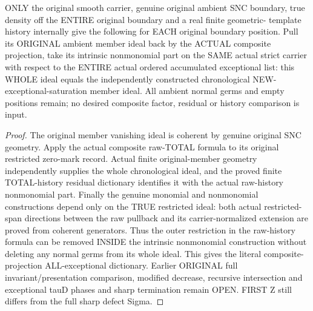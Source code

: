 \begin{theorem}
\label{hir:sharp-actual-original-composite-total-all-exceptional-residual}
\leanok
ONLY the original smooth carrier, genuine original ambient SNC boundary,
true density off the ENTIRE original boundary and a real finite geometric-
template history internally give the following for EACH original boundary
position. Pull its ORIGINAL ambient member ideal back by the ACTUAL
composite projection, take its intrinsic nonmonomial part on the SAME
actual strict carrier with respect to the ENTIRE actual ordered
accumulated exceptional list: this WHOLE ideal equals the independently
constructed chronological NEW-exceptional-saturation member ideal.
All ambient normal germs and empty positions remain; no desired composite
factor, residual or history comparison is input.
\end{theorem}
\begin{proof}
The original member vanishing ideal is coherent by genuine original SNC
geometry. Apply the actual composite raw-TOTAL formula to its original
restricted zero-mark record. Actual finite original-member geometry
independently supplies the whole chronological ideal, and the proved
finite TOTAL-history residual dictionary identifies it with the actual
raw-history nonmonomial part. Finally the genuine monomial and
nonmonomial constructions depend only on the TRUE restricted ideal:
both actual restricted-span directions between the raw pullback and its
carrier-normalized extension are proved from coherent generators. Thus
the outer restriction in the raw-history formula can be removed INSIDE
the intrinsic nonmonomial construction without deleting any normal
germs from its whole ideal. This gives the literal composite-projection
ALL-exceptional dictionary. Earlier ORIGINAL full invariant/presentation
comparison, modified decrease, recursive intersection and exceptional
tauD phases and sharp termination remain OPEN. FIRST Z still differs
from the full sharp defect Sigma.
\end{proof}
